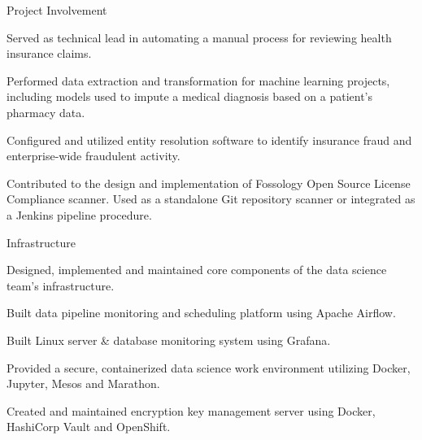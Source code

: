 \documentclass[]{deedy-resume-openfont}
\begin{document}
\vspace{\topsep} 
\begin{tightemize}
\item Project Involvement
    \vspace{\topsep}
    \begin{tightemize}
    \item Served as technical lead in automating a manual process for reviewing health insurance claims.
    \item Performed data extraction and transformation for machine learning projects, including models used to impute a medical diagnosis based on a patient's pharmacy data.
    \item Configured and utilized entity resolution software to identify insurance fraud and enterprise-wide fraudulent activity.
    \item Contributed to the design and implementation of Fossology Open Source License Compliance scanner.  Used as a standalone Git repository scanner or integrated as a Jenkins pipeline procedure.
    \end{tightemize}
    \vspace{\topsep}
\item Infrastructure
    \vspace{\topsep}
    \begin{tightemize}
    \item Designed, implemented and maintained core components of the data science team's infrastructure.
    \item Built data pipeline monitoring and scheduling platform using Apache Airflow.
    \item Built Linux server \& database monitoring system using Grafana.
    \item Provided a secure, containerized data science work environment utilizing Docker, Jupyter, Mesos and Marathon.
    \item Created and maintained encryption key management server using Docker, HashiCorp Vault and OpenShift.

\end{tightemize}
\end{tightemize}
\end{document}
